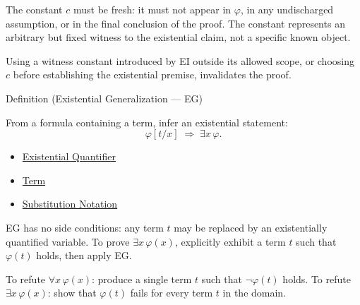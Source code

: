 \begin{remark*}
The constant $c$ must be fresh: it must not appear in $\varphi$, in any
undischarged assumption, or in the final conclusion of the proof. The constant
represents an arbitrary but fixed witness to the existential claim, not a
specific known object.
\end{remark*}

\begin{remark*}
Using a witness constant introduced by EI outside its allowed scope, or
choosing $c$ before establishing the existential premise, invalidates the proof.
\end{remark*}

\begin{definitionbox}{Definition (Existential Generalization --- EG)}
\begin{definition}\label{def:eg}
From a formula containing a term, infer an existential statement:
\[
\varphi[t/x] \;\Rightarrow\; \exists x\,\varphi.
\]
\end{definition}
\end{definitionbox}

\begin{dependencies}
\begin{itemize}
  \item \hyperref[def:existential-q]{Existential Quantifier}
  \item \hyperref[def:term]{Term}
  \item \hyperref[def:subst-notation]{Substitution Notation}
\end{itemize}
\end{dependencies}

\begin{remark*}
EG has no side conditions: any term $t$ may be replaced by an existentially
quantified variable. To prove $\exists x\,\varphi(x)$, explicitly exhibit a
term $t$ such that $\varphi(t)$ holds, then apply EG.
\end{remark*}

\begin{remark*}
To refute $\forall x\,\varphi(x)$: produce a single term $t$ such that
$\neg\varphi(t)$ holds. To refute $\exists x\,\varphi(x)$: show that $\varphi(t)$
fails for every term $t$ in the domain.
\end{remark*}
